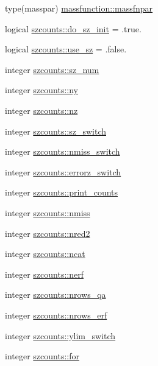 \begin{DoxyCompactItemize}
type(masspar) \mbox{\hyperlink{namespacemassfunction_ac3284bedbb7a589297bf6557a10e6f30}{massfunction\+::massfnpar}}
\item 
logical \mbox{\hyperlink{namespaceszcounts_a115079cdaf012d6e19dfcf1ef1d94de6}{szcounts\+::do\+\_\+sz\+\_\+init}} = .true.
\item 
logical \mbox{\hyperlink{namespaceszcounts_ab9a32458d184b4ed56c53c9082c7c67a}{szcounts\+::use\+\_\+sz}} = .false.
\item 
integer \mbox{\hyperlink{namespaceszcounts_aedc8585dbbc04a06f4913d1d15752108}{szcounts\+::sz\+\_\+num}}
\item 
integer \mbox{\hyperlink{namespaceszcounts_a2c231e5f41215024e487ea111556280a}{szcounts\+::ny}}
\item 
integer \mbox{\hyperlink{namespaceszcounts_a5b5fcdf2152c2af5169ef6293749f467}{szcounts\+::nz}}
\item 
integer \mbox{\hyperlink{namespaceszcounts_a7cd38bc2def0a071d9d8ccf4de51fd98}{szcounts\+::sz\+\_\+switch}}
\item 
integer \mbox{\hyperlink{namespaceszcounts_aeca7339cc77539d46b2ac1756c6eef3b}{szcounts\+::nmiss\+\_\+switch}}
\item 
integer \mbox{\hyperlink{namespaceszcounts_a6def443ac3e0a9afd588d7251c768760}{szcounts\+::errorz\+\_\+switch}}
\item 
integer \mbox{\hyperlink{namespaceszcounts_a89e748b08fe1c1bf0622bc36abb46e38}{szcounts\+::print\+\_\+counts}}
\item 
integer \mbox{\hyperlink{namespaceszcounts_aec365ec73a0a61aac5c8f6b386972ae3}{szcounts\+::nmiss}}
\item 
integer \mbox{\hyperlink{namespaceszcounts_a2918e9d37a3720ad5c9d793005f4c774}{szcounts\+::nred2}}
\item 
integer \mbox{\hyperlink{namespaceszcounts_adbee780b7de47a7a0ed712ecf643edad}{szcounts\+::ncat}}
\item 
integer \mbox{\hyperlink{namespaceszcounts_a0c42a07d181e073516184ad2778e1b0c}{szcounts\+::nerf}}
\item 
integer \mbox{\hyperlink{namespaceszcounts_a1e708b5794db648704f60ff689180607}{szcounts\+::nrows\+\_\+qa}}
\item 
integer \mbox{\hyperlink{namespaceszcounts_a439b480209d3bead1d0c7fdada2d2dda}{szcounts\+::nrows\+\_\+erf}}
\item 
integer \mbox{\hyperlink{namespaceszcounts_ac9b32f7b1676215c63a305f4ad36ac0a}{szcounts\+::ylim\+\_\+switch}}
\item 
integer \mbox{\hyperlink{namespaceszcounts_a27757054150c1df2c034d1404888b01d}{szcounts\+::for}}

\end{DoxyCompactItemize}
